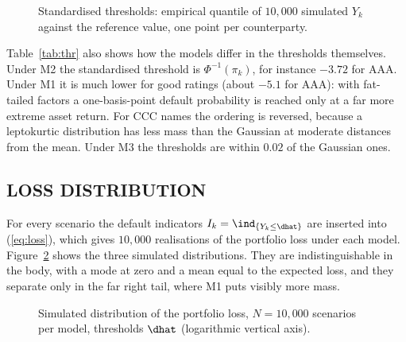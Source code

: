 \begin{table}[tb]
\caption{Thresholds by rating class. $\lceil N\pi_k\rceil$: number of simulated values at or below $\dhat$ ($N=10{,}000$); $\bar d_k^{\,*}$: average standardised reference threshold (\ref{eq:standardised}); PD ratio: range across the counterparties of the class of the default probability implied by $\dhat$ divided by the target $\pi_k$.}
\label{tab:thr}
\centering
{}
\end{table}

\begin{figure}[tb]
\centering
{}
\caption{Standardised thresholds: empirical quantile of $10{,}000$ simulated $Y_k$ against the reference value, one point per counterparty.}
\label{fig:thr}
\end{figure}

Table~\ref{tab:thr} also shows how the models differ in the thresholds themselves. Under M2 the standardised threshold is $\Phi^{-1}(\pi_k)$, for instance $-3.72$ for AAA. Under M1 it is much lower for good ratings (about $-5.1$ for AAA): with fat-tailed factors a one-basis-point default probability is reached only at a far more extreme asset return. For CCC names the ordering is reversed, because a leptokurtic distribution has less mass than the Gaussian at moderate distances from the mean. Under M3 the thresholds are within $0.02$ of the Gaussian ones.

\subsection{LOSS DISTRIBUTION}
\label{subsec:lossdist}
For every scenario the default indicators $I_k=\ind_{\{Y_k\le \dhat\}}$ are inserted into (\ref{eq:loss}), which gives $10{,}000$ realisations of the portfolio loss under each model. Figure~\ref{fig:hist} shows the three simulated distributions. They are indistinguishable in the body, with a mode at zero and a mean equal to the expected loss, and they separate only in the far right tail, where M1 puts visibly more mass.

\begin{figure}[tb]
\centering
{}
\caption{Simulated distribution of the portfolio loss, $N=10{,}000$ scenarios per model, thresholds $\dhat$ (logarithmic vertical axis).}
\label{fig:hist}
\end{figure}
